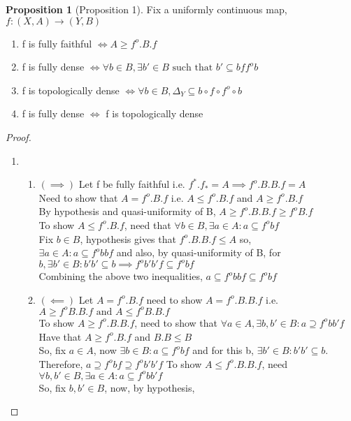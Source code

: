 \documentclass[18pt,a4paper]{article}
\theoremstyle{definition}
\newtheorem{proop}{Proposition}[section]
\begin{document}
		\begin{proop}[Proposition 1]
			Fix a uniformly continuous map, $f:(X,A) \rightarrow (Y,B)$
			\begin{enumerate}[label=(\alph*)]
				\item f is fully faithful $\iff A\geq f^o.B.f$
				\item f is fully dense $\iff \forall b\in B, \exists b' \in B \text{ such that }
					b' \subseteq bff^o b$
				\item f is topologically dense $\iff\forall b\in B,\Delta_Y\subseteq b\circ f\circ f^o\circ b$
				\item f is fully dense $\iff$ f is topologically dense
			\end{enumerate}
		\end{proop}
		\begin{proof}
		\item
			\begin{enumerate}[label=(\alph*)]
				\item \begin{enumerate}[label=(\roman*)]
					\item $ (\implies) $ Let f be fully faithful i.e. $f^*.f_*=A
						\implies f^o .B.B.f=A $\\
						Need to show that $A= f^o .B.f$ i.e.
						$A\leq f^o .B.f$ and  $A\geq f^o .B.f$\\
						By hypothesis and quasi-uniformity of B,
						$A\geq f^o .B.B.f \geq f^o B.f $\\
						To show $A \leq f^o .B.f$, need that $\forall b \in B, \exists a
						\in A : a \subseteq f^o bf$\\
						Fix $b\in B$, hypothesis gives that $f^o .B.B.f \leq A$ so, \\
						$\exists a \in A: a \subseteq f^o bbf$ and also, by
						quasi-uniformity of B, for $b, \exists b' \in B : b'b' \subseteq b
						\implies f^o b'b'f \subseteq f^o bf$\\
						Combining the above two inequalities,
						$a \subseteq f^o bbf \subseteq f^o bf$\\
					\item $(\impliedby)$ Let $A=f^o .B.f$ need to show $A=f^o.B.B.f$ i.e.
						$A\geq f^o B.B.f \text{ and } A\leq f^o B.B.f$\\
						To show $A\geq f^o .B.B.f$, need to show that $\forall a\in A,
						\exists b,b' \in B : a \supseteq f^o bb'f$\\
						Have that $A\geq f^o .B.f$ and $B.B \leq B$\\
						So, fix $a \in A$, now $\exists b\in B: a \subseteq f^o bf$
						and for this b, $\exists b'\in B: b'b' \subseteq b$.
						Therefore, $a \supseteq f^o bf \supseteq f^o b'b' f$
						To show $A\leq f^o .B.B.f$, need $\forall b,b'\in B, \exists
						a\in A : a \subseteq f^o bb'f$ \\
						So, fix $b,b' \in B $, now, by hypothesis,


\end{enumerate}
\end{enumerate}
\end{proof}
\end{document}
